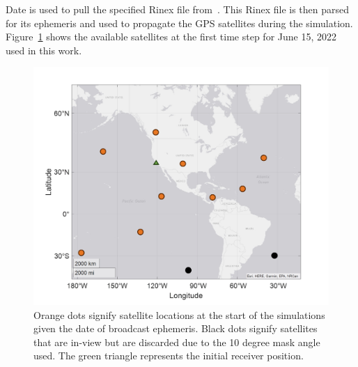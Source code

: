 Date is used to pull the specified Rinex file from~\cite{nollCrustalDynamicsData2010}. This Rinex file is then parsed for its ephemeris and used to propagate the GPS satellites during the simulation. Figure~\ref{fig:skyplot} shows the available satellites at the first time step for June 15, 2022 used in this work.

\begin{figure}[!ht]
    \centering
    \includegraphics[width=0.8\linewidth]{Figures/Results/skyplot.png}
    \caption{Orange dots signify satellite locations at the start of the simulations given the date of broadcast ephemeris. Black dots signify satellites that are in-view but are discarded due to the 10 degree mask angle used. The green triangle represents the initial receiver position.}\label{fig:skyplot}
\end{figure}

